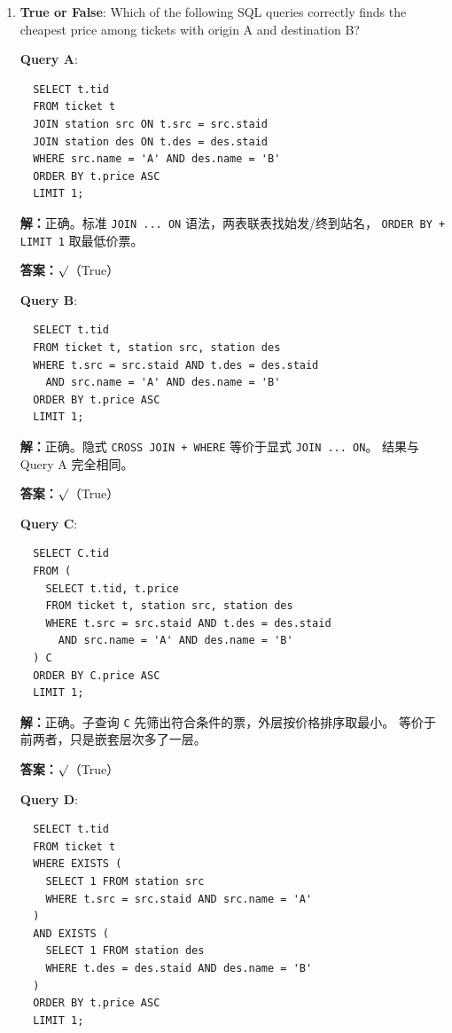 \documentclass[11pt,a4paper]{article}
\newcommand{\solution}{\par\noindent\textcolor{ansblue}{\textbf{解：}}}
\newcommand{\answer}{\par\noindent\textcolor{ansred}{\textbf{答案：}}}
\begin{document}
\begin{enumerate}[leftmargin=*,itemsep=6pt]
  \solution 正确。\texttt{>= ALL(subquery)} 等价于 \texttt{>= max(subquery)}，
  筛出计数不小于所有其他计数的站。逻辑正确。

  \answer \textcolor{ansred}{$\surd$（True）}

\item \textbf{True or False}: Which of the following SQL queries correctly finds
  the cheapest price among tickets with origin A and destination B?

  \textbf{Query A}:
  \begin{verbatim}
  SELECT t.tid
  FROM ticket t
  JOIN station src ON t.src = src.staid
  JOIN station des ON t.des = des.staid
  WHERE src.name = 'A' AND des.name = 'B'
  ORDER BY t.price ASC
  LIMIT 1;
  \end{verbatim}

  \solution 正确。标准 \texttt{JOIN ... ON} 语法，两表联表找始发/终到站名，
  \texttt{ORDER BY + LIMIT 1} 取最低价票。

  \answer \textcolor{ansred}{$\surd$（True）}

  \textbf{Query B}:
  \begin{verbatim}
  SELECT t.tid
  FROM ticket t, station src, station des
  WHERE t.src = src.staid AND t.des = des.staid
    AND src.name = 'A' AND des.name = 'B'
  ORDER BY t.price ASC
  LIMIT 1;
  \end{verbatim}

  \solution 正确。隐式 \texttt{CROSS JOIN + WHERE} 等价于显式 \texttt{JOIN ... ON}。
  结果与 Query A 完全相同。

  \answer \textcolor{ansred}{$\surd$（True）}

  \textbf{Query C}:
  \begin{verbatim}
  SELECT C.tid
  FROM (
    SELECT t.tid, t.price
    FROM ticket t, station src, station des
    WHERE t.src = src.staid AND t.des = des.staid
      AND src.name = 'A' AND des.name = 'B'
  ) C
  ORDER BY C.price ASC
  LIMIT 1;
  \end{verbatim}

  \solution 正确。子查询 \texttt{C} 先筛出符合条件的票，外层按价格排序取最小。
  等价于前两者，只是嵌套层次多了一层。

  \answer \textcolor{ansred}{$\surd$（True）}

  \textbf{Query D}:
  \begin{verbatim}
  SELECT t.tid
  FROM ticket t
  WHERE EXISTS (
    SELECT 1 FROM station src
    WHERE t.src = src.staid AND src.name = 'A'
  )
  AND EXISTS (
    SELECT 1 FROM station des
    WHERE t.des = des.staid AND des.name = 'B'
  )
  ORDER BY t.price ASC
  LIMIT 1;
  \end{verbatim}


\end{enumerate}
\end{document}
